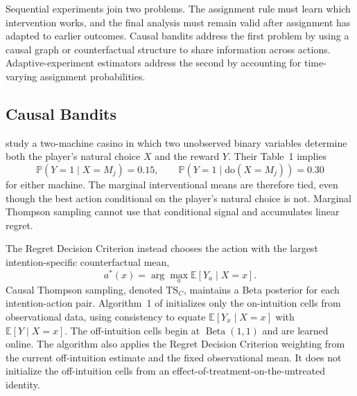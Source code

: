 
Sequential experiments join two problems. The assignment rule must learn which
intervention works, and the final analysis must remain valid after assignment has
adapted to earlier outcomes. Causal bandits address the first problem by using a
causal graph or counterfactual structure to share information across actions.
Adaptive-experiment estimators address the second by accounting for time-varying
assignment probabilities.

\subsection{Causal Bandits}
\label{subsec:causal_bandits}

\citet{bareinboim2015mabuc} study a two-machine casino in which two unobserved
binary variables determine both the player's natural choice $X$ and the reward
$Y$. Their Table~1 implies
\[
\mathbb P(Y=1\mid X=M_j)=0.15,
\qquad
\mathbb P(Y=1\mid \mathrm{do}(X=M_j))=0.30
\]
for either machine. The marginal interventional means are therefore tied, even
though the best action conditional on the player's natural choice is not.
Marginal Thompson sampling cannot use that conditional signal and accumulates
linear regret.

The Regret Decision Criterion instead chooses the action with the largest
intention-specific counterfactual mean,
\begin{equation}
a^*(x)=\arg\max_a \mathbb E[Y_a\mid X=x].
\label{eq:rdc}
\end{equation}
Causal Thompson sampling, denoted $\mathrm{TS}_C$, maintains a Beta posterior
for each intention-action pair. Algorithm~1 of \citet{bareinboim2015mabuc}
initializes only the on-intuition cells from observational data, using
consistency to equate $\mathbb E[Y_x\mid X=x]$ with
$\mathbb E[Y\mid X=x]$. The off-intuition cells begin at
$\operatorname{Beta}(1,1)$ and are learned online. The algorithm also applies
the Regret Decision Criterion weighting from the current off-intuition estimate
and the fixed observational mean. It does not initialize the off-intuition
cells from an effect-of-treatment-on-the-untreated identity.


